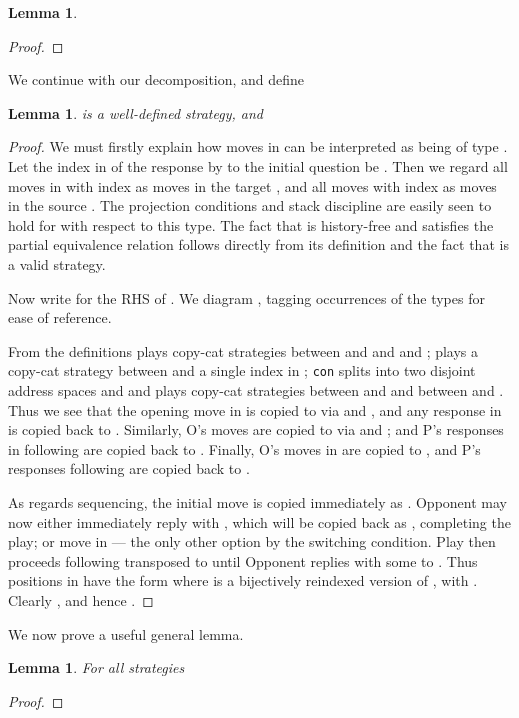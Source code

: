 \documentclass[11pt]{article}
\newtheorem{lemma}[theorem]{Lemma}
\begin{document}
\begin{lemma}\label{lem4}

\end{lemma}
\begin{proof}

\end{proof}

We continue with our decomposition, and define

\begin{lemma}\label{lem5}
 is a well-defined
strategy, and

\end{lemma}
\begin{proof}We must firstly explain how moves in  can be
interpreted as being of type . Let the index in  of the response
by  to the initial question  be . Then we regard
all moves in  with index  as moves in the
target  , and all moves with index  as moves in the
source . The projection conditions and
stack discipline are easily seen to hold for  with respect to
this type. The fact that  is history-free and satisfies
the partial equivalence relation follows directly from its
definition and the fact that  is a valid strategy.

Now write  for the RHS of . We diagram , tagging
occurrences of the types for ease of reference.



From the definitions  plays copy-cat strategies
between  and  and  and ;  plays a
copy-cat strategy between  and a single index
 in ;  {\tt con} splits
 into two disjoint address spaces
 and  and  plays copy-cat strategies between  and  and
between  and
. Thus we see that the opening move
in  is copied to  via  and , and
any response in  is copied back to . Similarly,
O's moves  are copied to  via  and
; and P's responses in  following  are
copied back to . Finally, O's moves in  are copied to , and P's responses following  are copied back to
.

As regards sequencing, the initial move  is copied
immediately as . Opponent may now either immediately
reply with , which will be copied back as ,
completing the play; or move in --- the only other
option by the switching condition. Play then proceeds following
 transposed to  until Opponent
replies with some  to . Thus positions in
 have the form  where  is a bijectively
reindexed version of , with . Clearly
, and hence
.

\end{proof}

We now prove a useful general lemma.
\begin{lemma}\label{lem6}
For all strategies


\end{lemma}
\begin{proof}

\end{proof}
\end{document}
